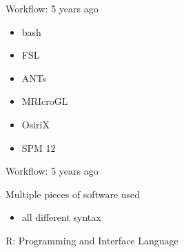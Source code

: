 \documentclass[ignorenonframetext,]{beamer}
\providecommand{\tightlist}{%
  \setlength{\itemsep}{0pt}\setlength{\parskip}{0pt}}
\begin{document}
\begin{frame}

\hypertarget{left_col2}{}
Workflow: 5 years ago

\begin{itemize}
\tightlist
\item
  bash 
\item
  FSL 
\item
  ANTs 
\item
  MRIcroGL 
\item
  OsiriX 
\item
  SPM 12 
\end{itemize}

\hypertarget{right_col2}{}

\end{frame}

\begin{frame}

\hypertarget{left_col2}{}
Workflow: 5 years ago

Multiple pieces of software used

\begin{itemize}
\tightlist
\item
  all different syntax
\end{itemize}

\hypertarget{right_col2}{}

\end{frame}

\begin{frame}{R: Programming and Interface Language}
\protect\hypertarget{r-programming-and-interface-language}{}

\end{frame}
\end{document}
